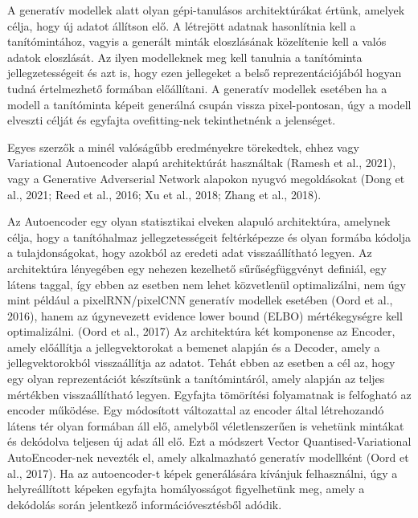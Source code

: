 
A generatív modellek alatt olyan gépi-tanulásos architektúrákat értünk, amelyek célja, hogy új adatot állítson elő. A létrejött adatnak hasonlítnia kell a tanítómintához, vagyis a generált minták eloszlásának közelítenie kell a valós adatok eloszlását. Az ilyen modelleknek meg kell tanulnia a tanítóminta jellegzetességeit és azt is, hogy ezen jellegeket a belső reprezentációjából hogyan tudná értelmezhető formában előállítani. A generatív modellek esetében ha a modell a tanítóminta képeit generálná csupán vissza pixel-pontosan, úgy a modell elveszti célját és egyfajta ovefitting-nek tekinthetnénk a jelenséget.

Egyes szerzők a minél valóságűbb eredményekre törekedtek, ehhez vagy Variational Autoencoder alapú architektúrát használtak (Ramesh et al., 2021), vagy a Generative Adverserial Network alapokon nyugvó megoldásokat (Dong et al., 2021; Reed et al., 2016; Xu et al., 2018; Zhang et al., 2018).

Az Autoencoder egy olyan statisztikai elveken alapuló architektúra, amelynek célja, hogy a tanítóhalmaz jellegzetességeit feltérképezze és olyan formába kódolja a tulajdonságokat, hogy azokból az eredeti adat visszaállítható legyen. Az architektúra lényegében egy nehezen kezelhető sűrűségfüggvényt definiál, egy látens taggal, így ebben az esetben nem lehet közvetlenül optimalizálni, nem úgy mint például a pixelRNN/pixelCNN generatív modellek esetében (Oord et al., 2016), hanem az úgynevezett evidence lower bound (ELBO) mértékegységre kell optimalizálni. (Oord et al., 2017) Az architektúra két komponense az Encoder, amely előállítja a jellegvektorokat a bemenet alapján és a Decoder, amely a jellegvektorokból visszaállítja az adatot. Tehát ebben az esetben a cél az, hogy egy olyan reprezentációt készítsünk a tanítómintáról, amely alapján az teljes mértékben visszaállítható legyen. Egyfajta tömörítési folyamatnak is felfogható az encoder működése. Egy módosított változattal az encoder által létrehozandó látens tér olyan formában áll elő, amelyből véletlenszerűen is vehetünk mintákat és dekódolva teljesen új adat áll elő. Ezt a módszert Vector Quantised-Variational AutoEncoder-nek nevezték el, amely alkalmazható generatív modellként (Oord et al., 2017).
Ha az autoencoder-t képek generálására kívánjuk felhasználni, úgy a helyreállított képeken egyfajta homályosságot figyelhetünk meg, amely a dekódolás során jelentkező információvesztésből adódik.

